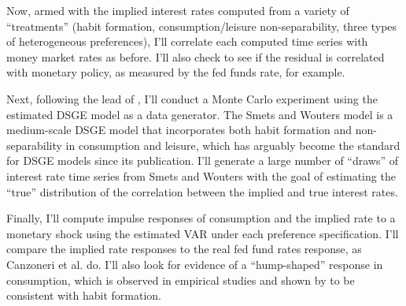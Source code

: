 \documentclass{hw}
\begin{document}
Now, armed with the implied interest rates computed from a variety of ``treatments'' (habit formation, consumption/leisure non-separability, three types of heterogeneous preferences), I'll correlate each computed time series with money market rates as before. I'll also check to see if the residual is correlated with monetary policy, as measured by the fed funds rate, for example.

Next, following the lead of \cite{gareis13}, I'll conduct a Monte Carlo experiment using the estimated \cite{smets07} DSGE model as a data generator. The Smets and Wouters model is a medium-scale DSGE model that incorporates both habit formation and non-separability in consumption and leisure, which has arguably become the standard for DSGE models since its publication. I'll generate a large number of ``draws'' of interest rate time series from Smets and Wouters with the goal of estimating the ``true'' distribution of the correlation between the implied and true interest rates.

Finally, I'll compute impulse responses of consumption and the implied rate to a monetary shock using the estimated VAR under each preference specification. I'll compare the implied rate responses to the real fed fund rates response, as Canzoneri et al. do. I'll also look for evidence of a ``hump-shaped'' response in consumption, which is observed in empirical studies and shown by \cite{fuhrer00} to be consistent with habit formation.


\end{document}
